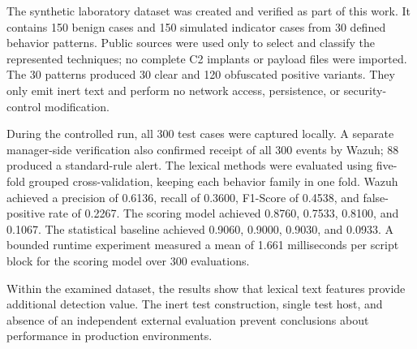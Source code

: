 \documentclass[12pt,a4paper,oneside,parskip=half]{scrreprt}
\begin{document}
The synthetic laboratory dataset was created and verified as part of this work. It contains 150 benign cases and 150 simulated indicator cases from 30 defined behavior patterns. Public sources were used only to select and classify the represented techniques; no complete C2 implants or payload files were imported. The 30 patterns produced 30 clear and 120 obfuscated positive variants. They only emit inert text and perform no network access, persistence, or security-control modification.

During the controlled run, all 300 test cases were captured locally. A separate manager-side verification also confirmed receipt of all 300 events by Wazuh; 88 produced a standard-rule alert. The lexical methods were evaluated using five-fold grouped cross-validation, keeping each behavior family in one fold. Wazuh achieved a precision of 0.6136, recall of 0.3600, F1-Score of 0.4538, and false-positive rate of 0.2267. The scoring model achieved 0.8760, 0.7533, 0.8100, and 0.1067. The statistical baseline achieved 0.9060, 0.9000, 0.9030, and 0.0933. A bounded runtime experiment measured a mean of 1.661 milliseconds per script block for the scoring model over 300 evaluations.

Within the examined dataset, the results show that lexical text features provide additional detection value. The inert test construction, single test host, and absence of an independent external evaluation prevent conclusions about performance in production environments.
\clearpage

{\singlespacing
\setlength{\parskip}{0pt}
\tableofcontents
}
\clearpage
{}
{}
\listoffigures
\clearpage
{}
{}
\listoftables
\clearpage
{}
{}
\lstlistoflistings
\clearpage
\end{document}
